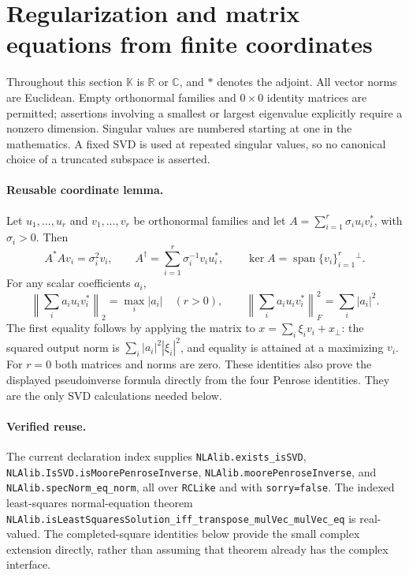 \documentclass[11pt,a4paper]{article}
\newcommand{\R}{\mathbb R}
\newcommand{\C}{\mathbb C}
\DeclareRobustCommand{\code}[1]{{\footnotesize\urlstyle{tt}\nolinkurl{#1}}}
\begin{document}
\section{Regularization and matrix equations from finite coordinates}
\label{sec:eq-frontier}

Throughout this section $\mathbb K$ is $\R$ or $\C$, and $*$ denotes the
adjoint. All vector norms are Euclidean. Empty orthonormal families and
$0\times0$ identity matrices are permitted; assertions involving a smallest
or largest eigenvalue explicitly require a nonzero dimension. Singular
values are numbered starting at one in the mathematics. A fixed SVD is
used at repeated singular values, so no canonical choice of a truncated
subspace is asserted.

\paragraph{Reusable coordinate lemma.}
Let $u_1,\ldots,u_r$ and $v_1,\ldots,v_r$ be orthonormal families and let
$A=\sum_{i=1}^r\sigma_i u_i v_i^*$, with $\sigma_i>0$. Then
\[
 A^*A v_i=\sigma_i^2v_i,\qquad
 A^\dagger=\sum_{i=1}^r\sigma_i^{-1}v_i u_i^*,\qquad
 \ker A=\operatorname{span}\{v_i\}_{i=1}^r{}^\perp.
\]
For any scalar coefficients $a_i$,
\[
 \left\|\sum_i a_i u_i v_i^*\right\|_2=\max_i|a_i|
 \quad(r>0),\qquad
 \left\|\sum_i a_i u_i v_i^*\right\|_F^2=\sum_i|a_i|^2.
\]
The first equality follows by applying the matrix to
$x=\sum_i\xi_i v_i+x_\perp$: the squared output norm is
$\sum_i|a_i|^2|\xi_i|^2$, and equality is attained at a maximizing $v_i$.
For $r=0$ both matrices and norms are zero. These identities also prove
the displayed pseudoinverse formula directly from the four Penrose
identities. They are the only SVD calculations needed below.

\paragraph{Verified reuse.}
The current declaration index supplies
\code{NLAlib.exists_isSVD},
\code{NLAlib.IsSVD.isMoorePenroseInverse},
\code{NLAlib.moorePenroseInverse}, and
\code{NLAlib.specNorm_eq_norm}, all over \code{RCLike} and with
\code{sorry=false}. The indexed least-squares normal-equation theorem
\code{NLAlib.isLeastSquaresSolution_iff_transpose_mulVec_mulVec_eq}
is real-valued. The completed-square identities below provide the small
complex extension directly, rather than assuming that theorem already has
the complex interface.
\end{document}

